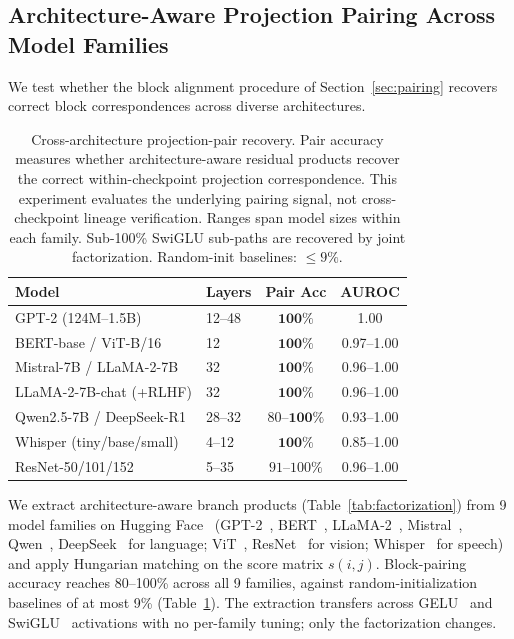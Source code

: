 \documentclass[letterpaper]{article}
\begin{document}
\subsection{Architecture-Aware Projection Pairing Across Model Families}\label{sec:exp-arch}

We test whether the block alignment procedure of Section~\ref{sec:pairing} recovers correct block correspondences across diverse architectures.

\begin{table}[t]
\centering
\small
\begin{tabular}{@{}llcc@{}}
\toprule
Model & Layers & Pair Acc & AUROC \\
\midrule
GPT-2 (124M--1.5B) & 12--48 & $\mathbf{100\%}$ & 1.00 \\
BERT-base / ViT-B/16 & 12 & $\mathbf{100\%}$ & 0.97--1.00 \\
Mistral-7B / LLaMA-2-7B & 32 & $\mathbf{100\%}$ & 0.96--1.00 \\
LLaMA-2-7B-chat (+RLHF) & 32 & $\mathbf{100\%}$ & 0.96--1.00 \\
Qwen2.5-7B / DeepSeek-R1 & 28--32 & 80--$\mathbf{100\%}$ & 0.93--1.00 \\
Whisper (tiny/base/small) & 4--12 & $\mathbf{100\%}$ & 0.85--1.00 \\
ResNet-50/101/152 & 5--35 & $91$--$100\%$ & 0.96--1.00 \\
\bottomrule
\end{tabular}
\caption{Cross-architecture projection-pair recovery. Pair accuracy measures whether architecture-aware residual products recover the correct within-checkpoint projection correspondence. This experiment evaluates the underlying pairing signal, not cross-checkpoint lineage verification. Ranges span model sizes within each family. Sub-100\% SwiGLU sub-paths are recovered by joint factorization. Random-init baselines: $\le 9\%$.}
\label{tab:transformer-family}
\end{table}

We extract architecture-aware branch products (Table~\ref{tab:factorization}) from 9 model families on Hugging Face~\citep{huggingface2024,openai-community2024} (GPT-2~\citep{radford2019gpt2}, BERT~\citep{devlin2019bert}, LLaMA-2~\citep{touvron2023llama}, Mistral~\citep{jiang2023mistral}, Qwen~\citep{yang2024qwen2}, DeepSeek~\citep{deepseek2025r1} for language; ViT~\citep{dosovitskiy2021vit}, ResNet~\citep{he2016deep} for vision; Whisper~\citep{radford2023whisper} for speech) and apply Hungarian matching on the score matrix $s(i,j)$. Block-pairing accuracy reaches 80--100\% across all 9 families, against random-initialization baselines of at most 9\% (Table~\ref{tab:transformer-family}). The extraction transfers across GELU~\citep{hendrycks2016gelu} and SwiGLU~\citep{shazeer2020swiglu} activations with no per-family tuning; only the factorization changes.
\end{document}

